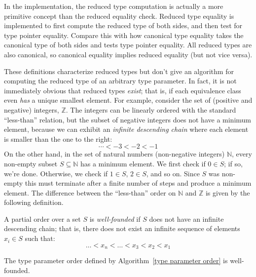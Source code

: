\documentclass[../generics]{subfiles}
\begin{document}
In the implementation, the reduced type computation is actually a more primitive concept than the reduced equality check. Reduced type equality is implemented to first compute the reduced type of both sides, and then test for type pointer equality. Compare this with how canonical type equality takes the canonical type of both sides and tests type pointer equality. All reduced types are also canonical, so canonical equality implies reduced equality (but not vice versa).

These definitions characterize reduced types but don't give an algorithm for computing the reduced type of an arbitrary type parameter. In fact, it is not immediately obvious that reduced types \emph{exist}; that is, if each equivalence class even \emph{has} a unique smallest element. For example, consider the set of (positive and negative) integers, $\mathbb{Z}$. The integers can be linearly ordered with the standard ``less-than'' relation, but the subset of negative integers does not have a minimum element, because we can exhibit an \emph{infinite descending chain} where each element is smaller than the one to the right:
\[\cdots < -3 < -2 < -1\]
On the other hand, in the set of natural numbers (non-negative integers) $\mathbb{N}$, every non-empty subset $S\subseteq\mathbb{N}$ has a minimum element. We first check if $0\in S$; if so, we're done. Otherwise, we check if $1\in S$, $2\in S$, and so on. Since $S$ was non-empty this must terminate after a finite number of steps and produce a minimum element. The difference between the ``less-than'' order on $\mathbb{N}$ and $\mathbb{Z}$ is given by the following definition.
\begin{definition}
A partial order over a set $S$ is \emph{well-founded} if $S$ does not have an infinite descending chain; that is, there does not exist an infinite sequence of elements $x_i\in S$ such that:
\[\ldots <x_n<\ldots <x_3<x_2<x_1\]
\end{definition}
\begin{proposition}\label{well founded type order} The type parameter order defined by Algorithm~\ref{type parameter order} is well-founded.
\end{proposition}
\end{document}
